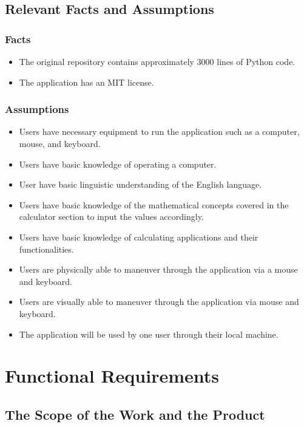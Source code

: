 \documentclass[12pt, titlepage]{article}
\begin{document}
\subsection{Relevant Facts and Assumptions}
\subsubsection{Facts}
\begin{itemize}
    \item The original repository contains approximately 3000 lines of Python code.
    \item The application has an MIT license.
\end{itemize}

\subsubsection{Assumptions}
\begin{itemize}
    \item Users have necessary equipment to run the application such as a computer, mouse, and keyboard.
    \item Users have basic knowledge of operating a computer.
    \item User have basic linguistic understanding of the English language.
    \item Users have basic knowledge of the mathematical concepts covered in the calculator section to input the values accordingly.
    \item Users have basic knowledge of calculating applications and their functionalities.
    \item Users are physically able to maneuver through the application via a mouse and keyboard.
    \item Users are visually able to maneuver through the application via mouse and keyboard.
    \item The application will be used by one user through their local machine.
\end{itemize}

\section{Functional Requirements}

\subsection{The Scope of the Work and the Product}
\end{document}
